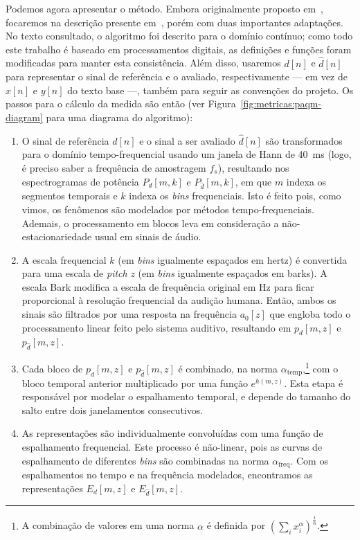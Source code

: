 Podemos agora apresentar o método. Embora originalmente proposto em~\cite{beerends-1992}, focaremos na descrição presente em~\cite{beerends-2002}, porém com duas importantes adaptações. No texto consultado, o algoritmo foi descrito para o domínio contínuo; como todo este trabalho é baseado em processamentos digitais, as definições e funções foram modificadas para manter esta consistência. Além disso, usaremos $d[n]$ e $\hat{d}[n]$ para representar o sinal de referência e o avaliado, respectivamente --- em vez de $x[n]$ e $y[n]$ do texto base ---, também para seguir as convenções do projeto. Os passos para o cálculo da medida são então (ver Figura~\ref{fig:metricas:paqm-diagram} para uma diagrama do algoritmo):
\begin{enumerate}
    \item O sinal de referência $d[n]$ e o sinal a ser avaliado $\hat{d}[n]$ são transformados para o domínio tempo-frequencial usando um janela de Hann de 40~ms (logo, é preciso saber a frequência de amostragem $f_s$), resultando nos espectrogramas de potência $P_d[m, k]$ e $P_{\hat{d}}[m, k]$, em que $m$ indexa os segmentos temporais e $k$ indexa os \textit{bins} frequenciais. Isto é feito pois, como vimos, os fenômenos são modelados por métodos tempo-frequenciais. Ademais, o processamento em blocos leva em consideração a não-estacionariedade usual em sinais de áudio.

    \item A escala frequencial $k$ (em \textit{bins} igualmente espaçados em hertz) é convertida para uma escala de \textit{pitch} $z$ (em \textit{bins} igualmente espaçados em barks). A escala Bark modifica a escala de frequência original em Hz para ficar proporcional à resolução frequencial da audição humana. Então, ambos os sinais são filtrados por uma resposta na frequência $a_0[z]$ que engloba todo o processamento linear feito pelo sistema auditivo, resultando em $p_d[m, z]$ e $p_{\hat{d}}[m, z]$.

    \item Cada bloco de $p_d[m, z]$ e $p_{\hat{d}}[m, z]$ é combinado, na norma $\alpha_{\text{temp}}$,\footnote{A combinação de valores em uma norma $\alpha$ é definida por $(\sum_i x_i^\alpha)^{\frac{1}{\alpha}}$.} com o bloco temporal anterior multiplicado por uma função $e^{h(m, z)}$. Esta etapa é responsável por modelar o espalhamento temporal, e depende do tamanho do salto entre dois janelamentos consecutivos.

    \item As representações são individualmente convoluídas com uma função de espalhamento frequencial. Este processo é não-linear, pois as curvas de espalhamento de diferentes \textit{bins} são combinadas na norma $\alpha_{\text{freq}}$. Com os espalhamentos no tempo e na frequência modelados, encontramos as representações $E_d[m, z]$ e $E_{\hat{d}}[m, z]$.
    

\end{enumerate}
